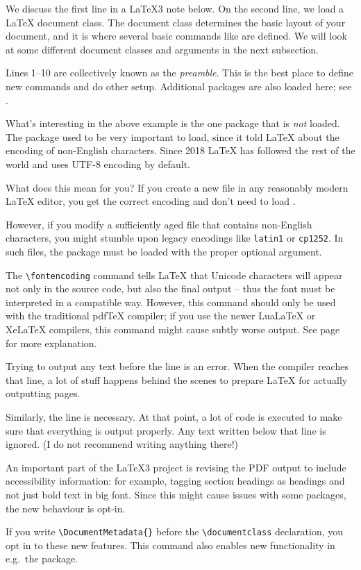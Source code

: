 We discuss the first line in a \LaTeX3 note below.
On the second line, we load a \LaTeX{} document class.
The document class determines the basic layout of your document,
and it is where several basic commands like  are defined.
We will look at some different document classes and arguments in the next subsection.

Lines 1--10 are collectively known as the \emph{preamble}.
This is the best place to define new commands and do other setup.
Additional packages are also loaded here; see .

\begin{latexthree}
What's interesting in the above example is the one package that is \emph{not} loaded.
The  package used to be very important to load,
since it told \LaTeX{} about the encoding of non-English characters.
Since 2018 \LaTeX{} has followed the rest of the world
and uses UTF-8 encoding by default.

What does this mean for you?
If you create a new file in any reasonably modern \LaTeX{} editor,
you get the correct encoding and don't need to load .

However, if you modify a sufficiently aged file that contains non-English characters,
you might stumble upon legacy encodings like \texttt{latin1} or \texttt{cp1252}.
In such files, the  package must be loaded with the proper optional argument.
\end{latexthree}

The \verb|\fontencoding| command tells \LaTeX{} that Unicode characters will appear
not only in the source code, but also the final output
-- thus the font must be interpreted in a compatible way.
However, this command should only be used with the traditional pdfTeX compiler;
if you use the newer LuaLaTeX or XeLaTeX compilers,
this command might cause subtly worse output.
See page~\pageref{rem:font encoding} for more explanation.


Trying to output any text before the \verb|| line is an error.
%
When the compiler reaches that line,
a lot of stuff happens behind the scenes to prepare \LaTeX{} for actually outputting pages.

Similarly, the \verb|| line is necessary.
At that point, a lot of code is executed to make sure that everything is output properly.
Any text written below that line is ignored.
(I do not recommend writing anything there!)

\begin{latexthree}
An important part of the \LaTeX3 project is revising the PDF output
to include accessibility information:
for example, tagging section headings as headings and not just bold text in big font.
Since this might cause issues with some packages, the new behaviour is opt-in.

If you write \verb|\DocumentMetadata{}|
before the \verb|\documentclass| declaration, you opt in to these new features.
This command also enables new functionality in e.g.\ the  package.
\end{latexthree}


